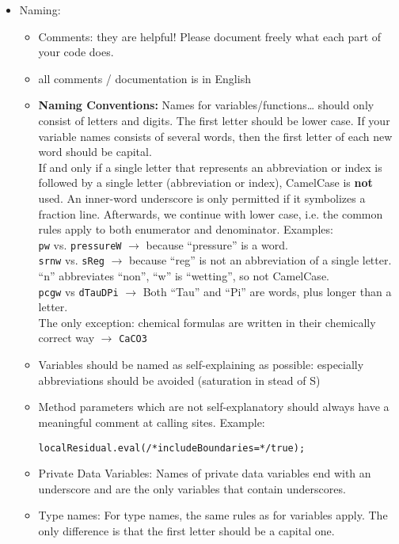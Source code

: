 \begin{itemize}
\item Naming: 
\begin{itemize}
\item Comments: they are helpful! Please document freely what each part of your code does. 
\item all comments / documentation is in English
\item \textbf{Naming Conventions:} Names for variables/functions\ldots \; should only consist of letters and digits. The first
letter should be lower case. If your variable names consists of several words, then 
the first letter of each new word should be capital. \\
If and only if a single letter that represents an abbreviation or index is followed by a single letter (abbreviation or index), CamelCase is {\bf not} used. An inner-word underscore is only permitted if it symbolizes a fraction line. Afterwards, we continue with lower case, i.e. the common rules apply to both enumerator and denominator. Examples: \\
\texttt{pw} vs. \texttt{pressureW} $\rightarrow$ because ``pressure'' is a word.\\
\texttt{srnw} vs. \texttt{sReg} $\rightarrow$ because ``reg'' is not an abbreviation of a single letter. ``n'' abbreviates ``non'', ``w'' is ``wetting'', so not CamelCase.\\
\texttt{pcgw} vs \texttt{dTauDPi} $\rightarrow$ Both ``Tau'' and ``Pi'' are words, plus longer than a letter.\\
The only exception: chemical formulas are written in their chemically correct way $\rightarrow$ \texttt{CaCO3}
\item Variables should be named as self-explaining as possible: especially abbreviations 
should be avoided (saturation in stead of S)
\item Method parameters which are not self-explanatory should always
  have a meaningful comment at calling sites. Example:
\begin{lstlisting}[style=DumuxCode]
   localResidual.eval(/*includeBoundaries=*/true);
\end{lstlisting}
\item Private Data Variables: Names of private data variables end with an underscore and are the only variables that contain underscores. 
\item Type names: For type names, the same rules as for variables apply. The only difference is that the first letter should be a capital one.

\end{itemize}
\end{itemize}
